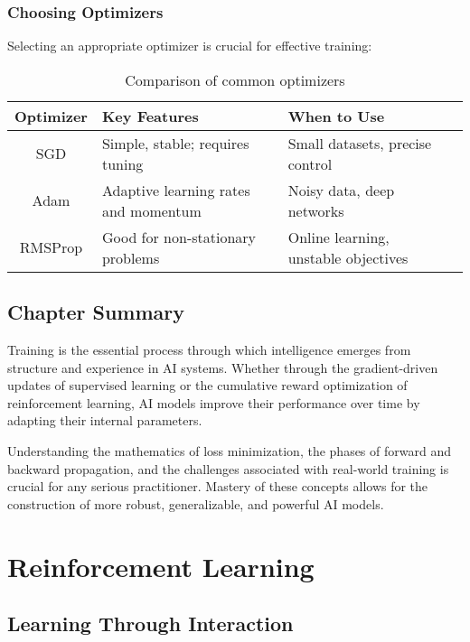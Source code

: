 \documentclass[openany]{book}
\begin{document}
\subsection{Choosing Optimizers}

Selecting an appropriate optimizer is crucial for effective training:

\begin{table}[h]
\centering
\begin{tabular}{c|lp{2in}p{1in}}
\hline
\textbf{Optimizer} & \textbf{Key Features} & \textbf{When to Use} \\ \hline
SGD & Simple, stable; requires tuning & Small datasets, precise control \\ \hline
Adam & Adaptive learning rates and momentum & Noisy data, deep networks \\ \hline
RMSProp & Good for non-stationary problems & Online learning, unstable 
objectives \\ \hline
\end{tabular}
\caption{Comparison of common optimizers}
\end{table}

\section{Chapter Summary}

Training is the essential process through which intelligence emerges from 
structure and experience in AI systems. Whether through the gradient-driven 
updates of supervised learning or the cumulative reward optimization of 
reinforcement learning, AI models improve their performance over time by 
adapting their internal parameters.

Understanding the mathematics of loss minimization, the phases of forward and 
backward propagation, and the challenges associated with real-world training is 
crucial for any serious practitioner. Mastery of these concepts allows for the 
construction of more robust, generalizable, and powerful AI models.

\chapter{Reinforcement Learning}

\section{Learning Through Interaction}
\end{document}
